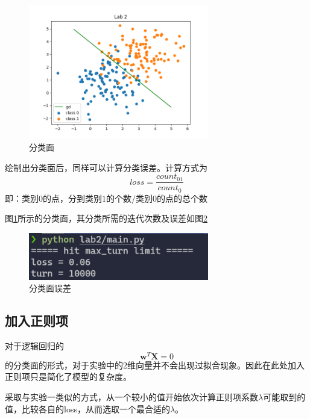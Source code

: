 \begin{figure}[htbp]
    \centering
    \includegraphics[width=0.7\textwidth]{figures/Figure_2.png}
    \caption{分类面}
    \label{sep_equ_figure}
\end{figure}

绘制出分类面后，同样可以计算分类误差。计算方式为
\begin{equation}
    loss = \dfrac{count_{01}}{count_0}
\end{equation}
即：类别$0$的点，分到类别$1$的个数$/$类别$0$的点的总个数

图\ref{sep_equ_figure}所示的分类面，其分类所需的迭代次数及误差如图\ref{loss}

\begin{figure}[htbp]
    \centering
    \includegraphics[width=0.7\textwidth]{figures/Figure_3.png}
    \caption{分类面误差}
    \label{loss}
\end{figure}

\subsection{加入正则项}

对于逻辑回归的
\begin{equation}
    \mathbf{w}^T\mathbf{X}=0
\end{equation}
的分类面的形式，对于实验中的2维向量并不会出现过拟合现象。因此在此处加入正则项只是简化了模型的复杂度。

采取与实验一类似的方式，从一个较小的值开始依次计算正则项系数$\lambda$可能取到的值，比较各自的loss，从而选取一个最合适的$\lambda$。


